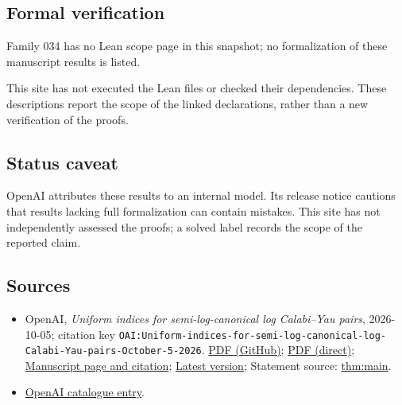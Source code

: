 \documentclass[11pt]{article}
\begin{document}
\subsection{Formal verification}
Family 034 has no Lean scope page in this snapshot; no formalization of these manuscript results is listed.

This site has not executed the Lean files or checked their dependencies. These descriptions report the scope of the linked declarations, rather than a new verification of the proofs.

\subsection{Status caveat}
OpenAI attributes these results to an internal model. Its release notice cautions that results lacking full formalization can contain mistakes. This site has not independently assessed the proofs; a solved label records the scope of the reported claim.

\subsection{Sources}
\begin{itemize}
\item OpenAI, \emph{Uniform indices for semi-log-canonical log Calabi–Yau pairs}, 2026-10-05; citation key \texttt{OAI:Uniform-indices-for-semi-log-canonical-log-Calabi-Yau-pairs-October-5-2026}. \href{https://github.com/openai/math/blob/adc7f1241b42e322a6451854ab7e4b4c146bf78a/preprints/Uniform-indices-for-semi-log-canonical-log-Calabi-Yau-pairs-October-5-2026/uniform-slc-index.pdf}{PDF (GitHub)}; \href{https://github.com/openai/math/raw/adc7f1241b42e322a6451854ab7e4b4c146bf78a/preprints/Uniform-indices-for-semi-log-canonical-log-Calabi-Yau-pairs-October-5-2026/uniform-slc-index.pdf}{PDF (direct)}; \href{https://github.com/openai/math/blob/adc7f1241b42e322a6451854ab7e4b4c146bf78a/preprints/Uniform-indices-for-semi-log-canonical-log-Calabi-Yau-pairs-October-5-2026/README.md}{Manuscript page and citation}; \href{https://github.com/openai/math/blob/main/preprints/Uniform-indices-for-semi-log-canonical-log-Calabi-Yau-pairs-October-5-2026/uniform-slc-index.pdf}{Latest version}; Statement source: \href{https://github.com/openai/math/blob/adc7f1241b42e322a6451854ab7e4b4c146bf78a/preprints/Uniform-indices-for-semi-log-canonical-log-Calabi-Yau-pairs-October-5-2026/build/sections/introduction.tex\#L29}{thm:main}.
\item \href{https://github.com/openai/math/blob/adc7f1241b42e322a6451854ab7e4b4c146bf78a/CONTENTS.md}{OpenAI catalogue entry}.
\end{itemize}
\end{document}
